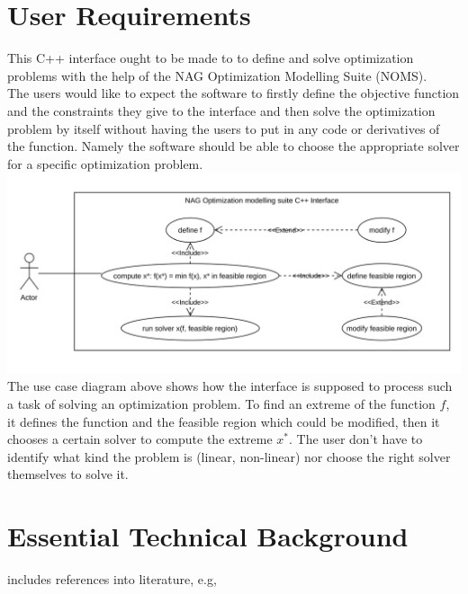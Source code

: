 \documentclass{book}
\begin{document}
\section{User Requirements}
This C++ interface ought to be made to to define and solve optimization problems with the help of the NAG Optimization Modelling Suite (NOMS).\\
The users would like to expect the software to firstly define the objective function and the constraints they give to the interface and then solve the optimization problem by itself without having the users to put in any code or derivatives of the function. Namely the software should be able to choose the appropriate solver for a specific optimization problem.\vspace{1em}\\
\includegraphics[width=\textwidth]{use case.pdf}
\vspace{1em}\\
The use case diagram above shows how the interface is supposed to process such a task of solving an optimization problem. To find an extreme of the function $f$, it defines the function and the feasible region which could be modified, then it chooses a certain solver to compute the extreme $x^{*}$. The user don't have to identify what kind the problem is (linear, non-linear) nor choose the right solver themselves to solve it. 


\section{Essential Technical Background}

includes references into literature, e.g, \cite{Ries1522Rad}
\end{document}
